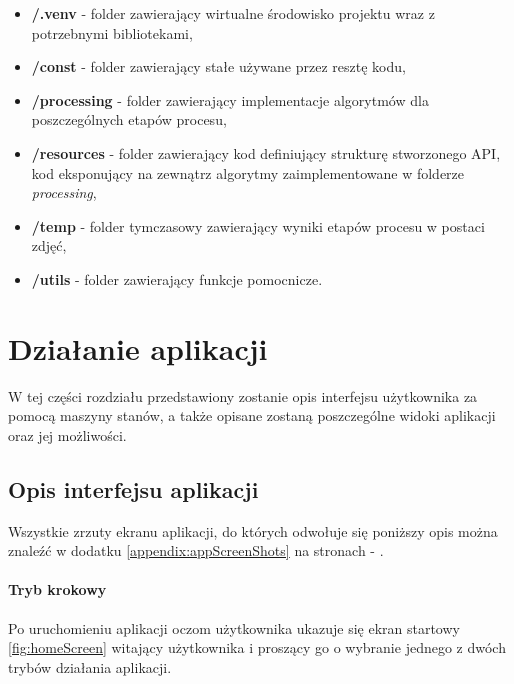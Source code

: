 \begin{itemize}
  \item \textbf{/.venv} - folder zawierający wirtualne środowisko projektu wraz z potrzebnymi
  bibliotekami,
  \item \textbf{/const} - folder zawierający stałe używane przez resztę kodu,
  \item \textbf{/processing} - folder zawierający implementacje algorytmów dla poszczególnych etapów
  procesu,
  \item \textbf{/resources} - folder zawierający kod definiujący strukturę stworzonego API,
  kod eksponujący na zewnątrz algorytmy zaimplementowane w folderze \textit{processing},
  \item \textbf{/temp} - folder tymczasowy zawierający wyniki etapów procesu w postaci zdję\'c,
  \item \textbf{/utils} - folder zawierający funkcje pomocnicze.
\end{itemize}

\section{Działanie aplikacji}

W tej części rozdziału przedstawiony zostanie opis interfejsu użytkownika za pomocą
maszyny stanów, a także opisane zostaną poszczególne widoki aplikacji oraz jej możliwości.

\subsection{Opis interfejsu aplikacji}

\noindent Wszystkie zrzuty ekranu aplikacji, do których odwołuje się poniższy opis można znale\'z\'c w dodatku
\ref{appendix:appScreenShots} na stronach \pageref{fig:homeScreen} - \pageref{fig:batchSingleEntryResult}. \newline

\vspace{-20pt}
\paragraph{Tryb krokowy\newline}

Po uruchomieniu aplikacji oczom użytkownika ukazuje się ekran startowy \ref{fig:homeScreen} witający użytkownika
i proszący go o wybranie jednego z dwóch trybów działania aplikacji.\newline

